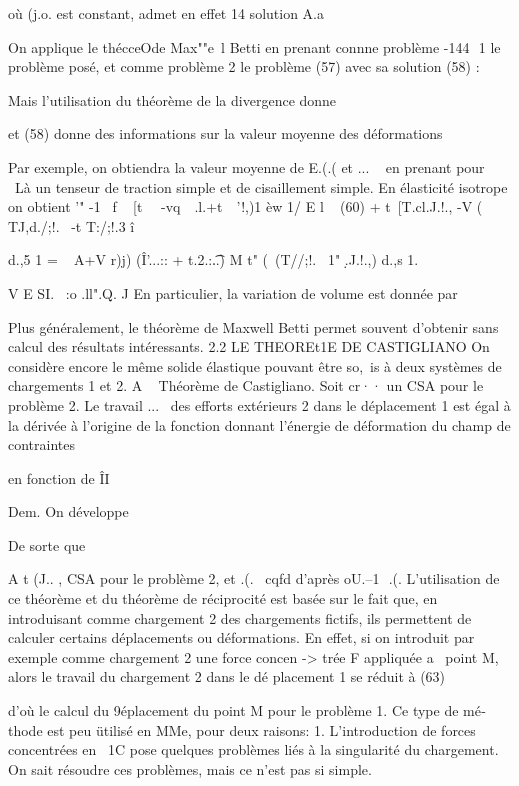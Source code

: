 {{{{{{{où (j.o. est constant, admet en effet 14 solution 
A.a 

On applique le thécceO\e de Max""e\ l Betti en prenant connne problème 
-144 ­
1 le problème posé, et 	comme problème 2 le problème (57) avec sa solution 
(58) : 

Mais l'utilisation du théorème de la divergence donne 

et (58) donne des informations sur la valeur moyenne des déformations 

Par exemple, on obtiendra la valeur moyenne de E.(.( et ... ~ en prenant pour 

~Là un tenseur de traction simple et de cisaillement simple. En élasticité 
isotrope on obtient 
'" -1 ~f ~ [t~~ -vq~~.l.+t~~'!,)1 èw­
1/ E l ~ 
(60) 	
+ t~[T.cl.J.!., -V ( TJ,d./;!.~ -t T:/;!.3 î} d.,5 1 = ~ A+V r)j) (Î'...:: + t.2.:\t..) M t" (\ (T//;!.~ 1" \d.J.!.,) d.,s 1. 

V E SI. ~:o .ll".Q. 	J 
En particulier, la variation de volume est donnée par 

Plus généralement, le 	théorème de Maxwell Betti permet souvent 
d'obtenir sans calcul 	des résultats intéressants. 
2.2 LE THEOREt1E DE CASTIGLIANO 
On considère encore le même solide élastique pouvant être so,~is à deux systèmes de chargements 1 et 2. 
A ~ 
Théorème de Castigliano. Soit cr·· un CSA pour le problème 2. Le travail 
...~ 
des efforts extérieurs 2 dans le déplacement 1 est égal à la dérivée à l'origine de la fonction donnant l'énergie de déformation du champ de 
contraintes 

en fonction de ÎI 

Dem. On développe 

De sorte que 

A t­
(J.. , CSA pour le problème 2, et 
.(.~ 
cqfd 
d'après oU.--1  
.(. 
L'utilisation de ce théorème et du théorème de réciprocité est basée sur le fait que, en introduisant comme chargement 2 des chargements fictifs, ils permettent de calculer certains déplacements ou déformations. En effet, si on introduit par exemple comme chargement 2 une force concen­
->
trée  F  appliquée  a~  point M,  alors  le  travail  du  chargement  2 dans  le dé­ 
placement  1  se  réduit  à  
(63)  

d'où le calcul du 9éplacement du point M pour le problème 1. Ce type de mé­thode est peu ütilisé en MMe, pour deux raisons: 
1. 
L'introduction de forces concentrées en ~1C pose quelques problèmes liés à la singularité du chargement. On sait résoudre ces problèmes, mais ce n'est pas si simple. 

}}}}}}
